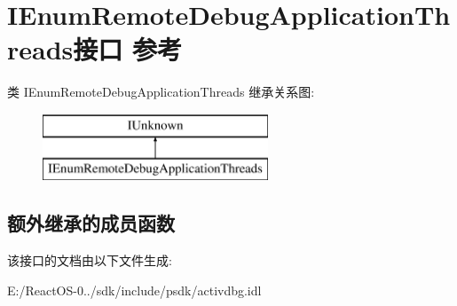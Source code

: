 \hypertarget{interface_i_enum_remote_debug_application_threads}{}\section{I\+Enum\+Remote\+Debug\+Application\+Threads接口 参考}
\label{interface_i_enum_remote_debug_application_threads}
类 I\+Enum\+Remote\+Debug\+Application\+Threads 继承关系图\+:\begin{figure}[H]
\begin{center}
\leavevmode
\includegraphics[height=2.000000cm]{interface_i_enum_remote_debug_application_threads}
\end{center}
\end{figure}
\subsection*{额外继承的成员函数}


该接口的文档由以下文件生成\+:\begin{DoxyCompactItemize}
\item 
E\+:/\+React\+O\+S-\/0../sdk/include/psdk/activdbg.\+idl\end{DoxyCompactItemize}
